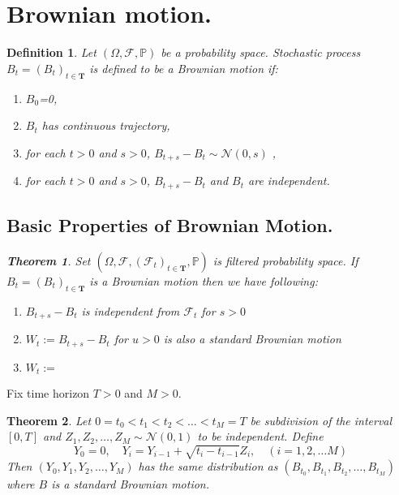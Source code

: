 \documentclass{book}
\newtheorem{definition}{Definition}[section]
\newtheorem{theorem}{Theorem}[section]
\begin{document}
 \section{Brownian motion.}
\begin{definition}
Let $(\Omega,\mathcal{F},\mathbb{P})$ be a probability space. Stochastic process $B_{t}=(B_{t})_{t\in \mathbf{T}}$ is defined to be a Brownian motion if:
\begin{enumerate}
\item $B_{0}$=0,
\item $B_{t}$ has continuous trajectory,
\item  for each $t>0$ and $s>0$, $B_{t+s}-B_{t}\sim \mathcal{N}(0,s)$ ,
\item  for each $t>0$ and $s>0$, $B_{t+s}-B_{t}$ and $B_{t}$ are independent. 
\end{enumerate}
\subsection{Basic Properties of Brownian Motion.}
\begin{theorem}
Set $(\varOmega,\mathcal{F},(\mathcal{F}_{t})_{t\in\mathbf{T}},\mathbb{P})$ is filtered probability space. If $B_{t}=(B_{t})_{t\in \mathbf{T}}$ is a Brownian motion then we have following:
\begin{enumerate}
\item $B_{t+s}-B_{t}$ is independent from $\mathcal{F}_{t}$ for $s>0$
\item $W_{t}:=B_{t+s}-B_{t}$ for $u>0$ is also a standard Brownian motion
\item $W_{t}:=$
\end{enumerate}

\end{theorem}
\end{definition}
Fix time horizon $T>0$ and $M>0$.   
\begin{theorem}
Let $0=t_{0}<t_{1}<t_{2}<\dots<t_{M}=T$ be subdivision of the interval $[0,T]$ and $Z_{1},Z_{2},\dots,Z_{M}\sim\mathcal{N}(0,1)$ to be independent. Define
\begin{equation}
\nonumber
Y_{0}=0,\quad Y_{i}=Y_{i-1}+\sqrt{t_{i}-t_{i-1}}Z_{i}, \quad (i=1,2,\dots M)
\end{equation}
Then $(Y_{0},Y_{1},Y_{2},\dots,Y_{M})$ has the same distribution as  $(B_{t_{0}},B_{t_{1}},B_{t_{2}},\dots,B_{t_{M}})$ where $B$ is a standard Brownian motion.
\end{theorem}
\end{document}
